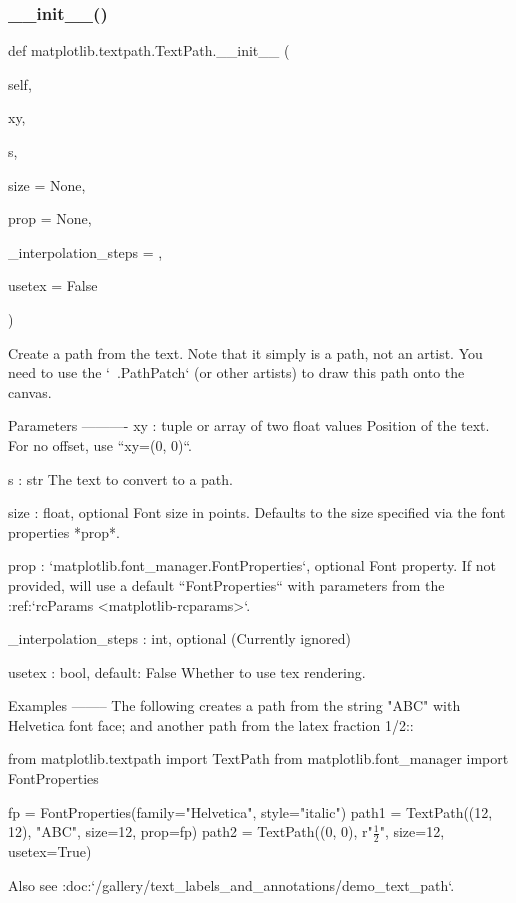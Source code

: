 \subsubsection{\texorpdfstring{\+\_\+\+\_\+init\+\_\+\+\_\+()}{\_\_init\_\_()}}
{\footnotesize\ttfamily def matplotlib.\+textpath.\+Text\+Path.\+\_\+\+\_\+init\+\_\+\+\_\+ (\begin{DoxyParamCaption}\item[{}]{self,  }\item[{}]{xy,  }\item[{}]{s,  }\item[{}]{size = {\ttfamily None},  }\item[{}]{prop = {\ttfamily None},  }\item[{}]{\+\_\+interpolation\+\_\+steps = {},  }\item[{}]{usetex = {\ttfamily False} }\end{DoxyParamCaption})}

\begin{DoxyVerb}Create a path from the text. Note that it simply is a path,
not an artist. You need to use the `~.PathPatch` (or other artists)
to draw this path onto the canvas.

Parameters
----------
xy : tuple or array of two float values
    Position of the text. For no offset, use ``xy=(0, 0)``.

s : str
    The text to convert to a path.

size : float, optional
    Font size in points. Defaults to the size specified via the font
    properties *prop*.

prop : `matplotlib.font_manager.FontProperties`, optional
    Font property. If not provided, will use a default
    ``FontProperties`` with parameters from the
    :ref:`rcParams <matplotlib-rcparams>`.

_interpolation_steps : int, optional
    (Currently ignored)

usetex : bool, default: False
    Whether to use tex rendering.

Examples
--------
The following creates a path from the string "ABC" with Helvetica
font face; and another path from the latex fraction 1/2::

    from matplotlib.textpath import TextPath
    from matplotlib.font_manager import FontProperties

    fp = FontProperties(family="Helvetica", style="italic")
    path1 = TextPath((12, 12), "ABC", size=12, prop=fp)
    path2 = TextPath((0, 0), r"$\frac{1}{2}$", size=12, usetex=True)

Also see :doc:`/gallery/text_labels_and_annotations/demo_text_path`.
\end{DoxyVerb}
 

